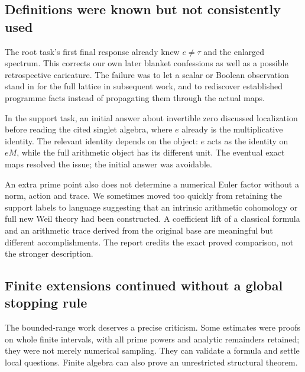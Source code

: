 \documentclass[
  british,
  11pt,
  a4paper,
]{article}
\begin{document}
\subsection{Definitions were known but not consistently
used}\label{definitions-were-known-but-not-consistently-used}

The root task's first final response already knew \(e\ne\tau\) and the
enlarged spectrum. This corrects our own later blanket confessions as
well as a possible retrospective caricature. The failure was to let a
scalar or Boolean observation stand in for the full lattice in
subsequent work, and to rediscover established programme facts instead
of propagating them through the actual maps.

In the support task, an initial answer about invertible zero discussed
localization before reading the cited singlet algebra, where \(e\)
already is the multiplicative identity. The relevant identity depends on
the object: \(e\) acts as the identity on \(eM\), while the full
arithmetic object has its different unit. The eventual exact maps
resolved the issue; the initial answer was avoidable.

An extra prime point also does not determine a numerical Euler factor
without a norm, action and trace. We sometimes moved too quickly from
retaining the support labels to language suggesting that an intrinsic
arithmetic cohomology or full new Weil theory had been constructed. A
coefficient lift of a classical formula and an arithmetic trace derived
from the original base are meaningful but different accomplishments. The
report credits the exact proved comparison, not the stronger
description.

\subsection{Finite extensions continued without a global stopping
rule}\label{finite-extensions-continued-without-a-global-stopping-rule}

The bounded-range work deserves a precise criticism. Some estimates were
proofs on whole finite intervals, with all prime powers and analytic
remainders retained; they were not merely numerical sampling. They can
validate a formula and settle local questions. Finite algebra can also
prove an unrestricted structural theorem.
\end{document}
